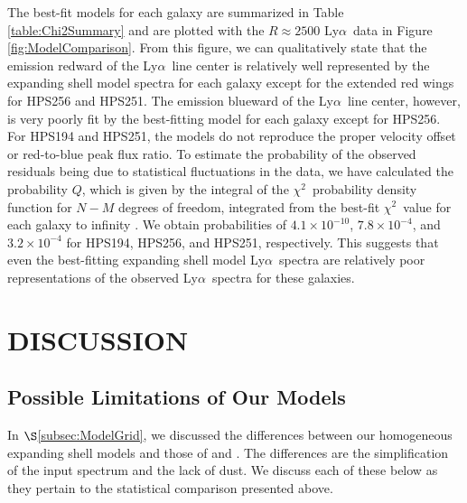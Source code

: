 \documentclass{emulateapj}
\newcommand{\lya}{Ly$\alpha$}
\def\chisq{$\chi^{2}$}
\begin{document}
The best-fit models for each galaxy are summarized in Table \ref{table:Chi2Summary} and are plotted with the $R\approx2500$ \lya\ data in Figure \ref{fig:ModelComparison}. From this figure, we can qualitatively state that the emission redward of the \lya\ line center is relatively well represented by the expanding shell model spectra for each galaxy except for the extended red wings for HPS256 and HPS251. The emission blueward of the \lya\ line center, however, is very poorly fit by the best-fitting model for each galaxy except for HPS256. For HPS194 and HPS251, the models do not reproduce the proper velocity offset or red-to-blue peak flux ratio. To estimate the probability of the observed residuals being due to statistical fluctuations in the data, we have calculated the probability $Q$, which is given by the integral of the \chisq\ probability density function for $N-M$ degrees of freedom, integrated from the best-fit \chisq\ value for each galaxy to infinity \citep{press1992}. We obtain probabilities of $4.1\times10^{-10}$, $7.8\times10^{-4}$, and $3.2\times10^{-4}$ for HPS194, HPS256, and HPS251, respectively. This suggests that even the best-fitting expanding shell model \lya\ spectra are relatively poor representations of the observed \lya\ spectra for these galaxies.

\section{DISCUSSION}\label{sec:Discussion}
\subsection{Possible Limitations of Our Models}\label{subsec:Limitations}
In $\S$\ref{subsec:ModelGrid}, we discussed the differences between our homogeneous expanding shell models and those of \citet{verhamme2006} and \citet{schaerer2011}. The differences are the simplification of the input spectrum and the lack of dust. We discuss each of these below as they pertain to the statistical comparison presented above. 
\end{document}

